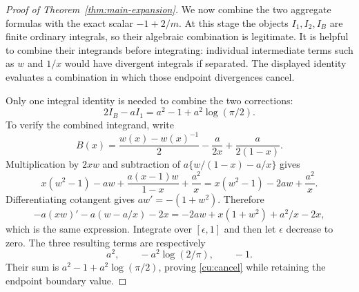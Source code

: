 \begin{proof}[Proof of Theorem~\ref{thm:main-expansion}]
We now combine the two aggregate formulas with the exact scalar
$-1+2/m$. At this stage the objects $I_1,I_2,I_B$ are finite
ordinary integrals, so their algebraic combination is legitimate.
It is helpful to combine their integrands before integrating:
individual intermediate terms such as $w$ and $1/x$ would have
divergent integrals if separated. The displayed identity evaluates
a combination in which those endpoint divergences cancel.

Only one integral identity is needed to combine the two corrections:
\begin{equation}\label{cu:cancel}
 2I_B-aI_1=a^2-1+a^2\log(\pi/2).
\end{equation}
To verify the combined integrand, write
\[
 B(x)=\frac{w(x)-w(x)^{-1}}2-\frac{a}{2x}
                                      +\frac{a}{2(1-x)}.
\]
Multiplication by $2xw$ and subtraction of
$a\{w/(1-x)-a/x\}$ gives
\[
 x(w^2-1)-aw+\frac{a(x-1)w}{1-x}+\frac{a^2}{x}
     =x(w^2-1)-2aw+\frac{a^2}{x}.
\]
Differentiating cotangent gives $aw'=-(1+w^2)$.
Therefore
\[
 -a(xw)'-a(w-a/x)-2x
 =-2aw+x(1+w^2)+a^2/x-2x,
\]
which is the same expression. Integrate over $[\epsilon,1]$
and then let $\epsilon$ decrease to zero. The three resulting
terms are respectively
\[
 a^2,\qquad -a^2\log(2/\pi),\qquad -1.
\]
Their sum is $a^2-1+a^2\log(\pi/2)$, proving
\eqref{cu:cancel} while retaining the endpoint boundary value.


\end{proof}
